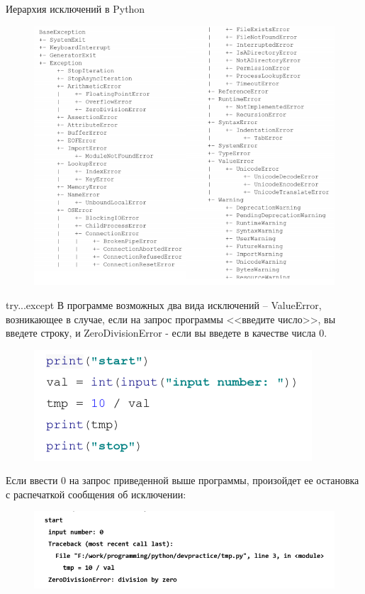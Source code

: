 \documentclass[xcolor=table]{beamer}
\begin{document}
\begin{frame}{Иерархия исключений в Python}
	\begin{figure}[h]
		\centering
		\includegraphics[scale=0.7]{images/lec08-pic02-python.png}
	\end{figure}
\end{frame}

\begin{frame}{try...except}
	В программе возможных два вида исключений -- ValueError, возникающее в случае, если на запрос программы <<введите число>>, вы
введете строку, и ZeroDivisionError - если вы введете в качестве числа 0.
	\begin{figure}[h]
		\centering
		\includegraphics[scale=0.7]{images/lec08-pic04-python.png}
	\end{figure}
	Если ввести 0 на запрос приведенной выше программы, произойдет ее
остановка с распечаткой сообщения об исключении:	
	\begin{figure}[h]
		\centering
		\includegraphics[scale=0.7]{images/lec08-pic05-python.png}
	\end{figure}
\end{frame}
\end{document}
